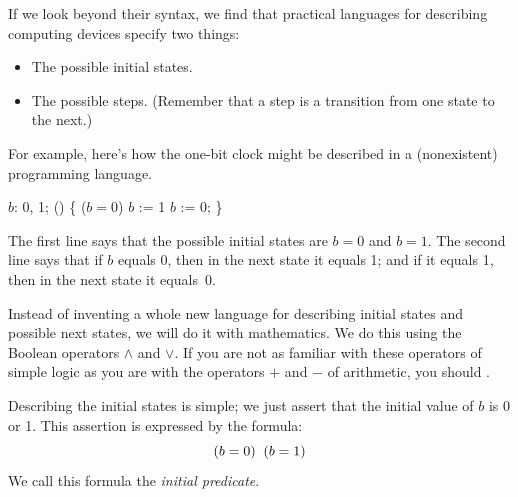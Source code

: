 \documentclass[fleqn,leqno]{article}
\begin{document}
If we look beyond their syntax, we find that practical languages for
describing computing devices specify two things:
\begin{itemize}
\item The possible initial states.

\item The possible 
steps.  (Remember that a step is a transition from one state to the
next.)
\end{itemize}
For example, here's how the one-bit clock might be
described in a (nonexistent) programming language.
\begin{program}
 $b$: 0, 1; 
 () \{  ($b=0$) $b$ := 1 
                           $b$ := 0; \} 
\end{program}
The first line says that the possible initial states are $b=0$ and
$b=1$.  The second line says that if $b$ equals 0, then in the next
state it equals 1; and if it equals 1, then in the next state it
equals~0.

Instead of inventing a whole new language for describing initial
states and possible next states, we will do it with mathematics.  We
do this using the Boolean operators $\land$ and $\lor$.  If you are
not as familiar with these operators of simple logic as you are with
the operators $+$ and $-$ of arithmetic, you should
\textsf{}.

Describing the initial states is simple; we just assert that the 
initial value of $b$ is 0 or 1.  This assertion is expressed by
the formula:
 \[ (b=0) \; \/ \; (b=1)\]
We call this formula the 
\emph{initial predicate}.
\end{document}
